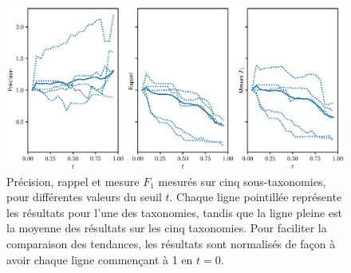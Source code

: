 \begin{figure}[h]
    \centering
    \includegraphics[width=\textwidth]{fig/plot/threshold_breakdown_avg_no_event.eps}
    \caption[Influence du seuil de probabilité sur l'extraction de taxonomie]{Précision, rappel et mesure $F_1$ mesurés sur cinq sous-taxonomies, pour différentes valeurs du seuil $t$. Chaque ligne pointillée représente les résultats pour l'une des taxonomies, tandis que la ligne pleine est la moyenne des résultats sur les cinq taxonomies. Pour faciliter la comparaison des tendances, les résultats sont normalisés de façon à avoir chaque ligne commençant à 1 en $t = 0$.}
    \label{fig:threshold-search-1}
\end{figure}

